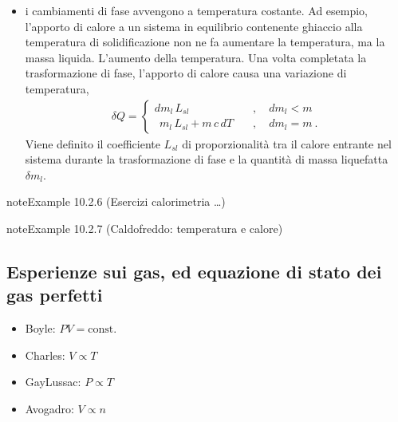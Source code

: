 \documentclass[letterpaper,10pt,italian]{jupyterBook}
\begin{document}
\begin{itemize}
\begin{itemize}
\end{itemize}

\item {} 
\sphinxAtStartPar
i cambiamenti di fase avvengono a temperatura costante. Ad esempio, l’apporto di calore a un sistema in equilibrio contenente ghiaccio alla temperatura di solidificazione non ne fa aumentare la temperatura, ma la massa liquida. L’aumento della temperatura. Una volta completata la trasformazione di fase, l’apporto di calore causa una variazione di temperatura,
\begin{equation*}
\begin{split}\delta Q = \begin{cases}
      d m_{l} \, L_{sl}                 \quad & , \quad {d m_l < m} \\
    \ \ m_{l} \, L_{sl} + m \, c \, d T \quad & , \quad {d m_l = m} \ .
    \end{cases}\end{split}
\end{equation*}
\sphinxAtStartPar
Viene definito  il coefficiente \(L_{sl}\) di proporzionalità tra il calore entrante nel sistema durante la trasformazione di fase e la quantità di massa liquefatta \(\delta m_l\).

\end{itemize}
\label{ch/thermodynamics/foundation-experiments:example-5}
\begin{sphinxadmonition}{note}{Example 10.2.6 (Esercizi calorimetria \sphinxhyphen{} …)}


\end{sphinxadmonition}
\label{ch/thermodynamics/foundation-experiments:example-6}
\begin{sphinxadmonition}{note}{Example 10.2.7 (Caldo\sphinxhyphen{}freddo: temperatura e calore)}


\end{sphinxadmonition}


\subsection{Esperienze sui gas, ed equazione di stato dei gas perfetti}
\label{\detokenize{ch/thermodynamics/foundation-experiments:esperienze-sui-gas-ed-equazione-di-stato-dei-gas-perfetti}}\begin{itemize}
\item {} 
\sphinxAtStartPar
Boyle: \(PV = \text{const.}\)

\item {} 
\sphinxAtStartPar
Charles: \(V \propto T\)

\item {} 
\sphinxAtStartPar
Gay\sphinxhyphen{}Lussac: \(P \propto T\)

\item {} 
\sphinxAtStartPar
Avogadro: \(V \propto n\)

\end{itemize}
\end{document}
